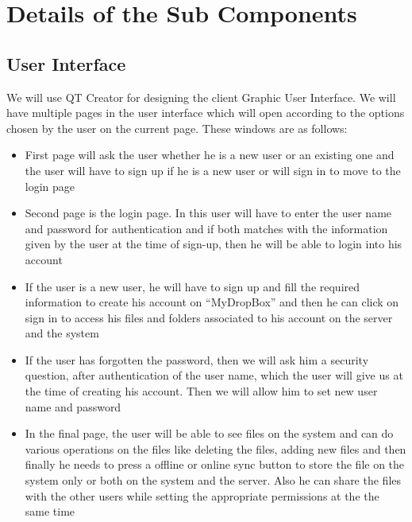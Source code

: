 \documentclass{article}
\begin{document}
	\section{Details of the Sub Components}
		\subsection{User Interface}
		We will use QT Creator for designing the client Graphic User Interface. We will have multiple pages in the user interface which will open according to the options chosen by the user on the current page. These windows are as follows:
			\begin{itemize}
				\item First page will ask the user whether he is a new user or an existing one and the user will have to sign up if he is a new user or  will sign in to move to the login page
				\item Second page is the login page. In this user will have to enter the user name and password for authentication and if both matches with the information given by the user at the time of sign-up, then he will be able to login into his account
				\item If the user is a new user, he will have to sign up and fill the required information to create his account on ``MyDropBox'' and then he can click on sign in to access his files and folders associated to his account on the server and the system
				\item If the user has forgotten the password, then we will ask him a security question, after authentication of the user name, which the user will give us at the time of creating his account. Then we will allow him to set new user name and password
				\item In the final page, the user will be able to see files on the system and can do various operations on the files like deleting the files, adding new files and then finally he needs to press a offline or online sync button to store the file on the system only or both on the system and the server. Also he can share the files with the other users while setting the appropriate permissions at the the same time
			\end{itemize}
\end{document}

